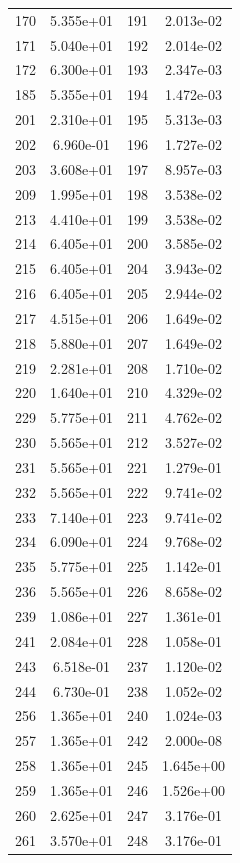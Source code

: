\documentclass[12pt]{article}
\begin{document}
\begin{longtable}{@{}cccc@{}}
170 & 5.355e+01 & 191 & 2.013e-02 \\
171 & 5.040e+01 & 192 & 2.014e-02 \\
172 & 6.300e+01 & 193 & 2.347e-03 \\
185 & 5.355e+01 & 194 & 1.472e-03 \\
201 & 2.310e+01 & 195 & 5.313e-03 \\
202 & 6.960e-01 & 196 & 1.727e-02 \\
203 & 3.608e+01 & 197 & 8.957e-03 \\
209 & 1.995e+01 & 198 & 3.538e-02 \\
213 & 4.410e+01 & 199 & 3.538e-02 \\
214 & 6.405e+01 & 200 & 3.585e-02 \\
215 & 6.405e+01 & 204 & 3.943e-02 \\
216 & 6.405e+01 & 205 & 2.944e-02 \\
217 & 4.515e+01 & 206 & 1.649e-02 \\
218 & 5.880e+01 & 207 & 1.649e-02 \\
219 & 2.281e+01 & 208 & 1.710e-02 \\
220 & 1.640e+01 & 210 & 4.329e-02 \\
229 & 5.775e+01 & 211 & 4.762e-02 \\
230 & 5.565e+01 & 212 & 3.527e-02 \\
231 & 5.565e+01 & 221 & 1.279e-01 \\
232 & 5.565e+01 & 222 & 9.741e-02 \\
233 & 7.140e+01 & 223 & 9.741e-02 \\
234 & 6.090e+01 & 224 & 9.768e-02 \\
235 & 5.775e+01 & 225 & 1.142e-01 \\
236 & 5.565e+01 & 226 & 8.658e-02 \\
239 & 1.086e+01 & 227 & 1.361e-01 \\
241 & 2.084e+01 & 228 & 1.058e-01 \\
243 & 6.518e-01 & 237 & 1.120e-02 \\
244 & 6.730e-01 & 238 & 1.052e-02 \\
256 & 1.365e+01 & 240 & 1.024e-03 \\
257 & 1.365e+01 & 242 & 2.000e-08 \\
258 & 1.365e+01 & 245 & 1.645e+00 \\
259 & 1.365e+01 & 246 & 1.526e+00 \\
260 & 2.625e+01 & 247 & 3.176e-01 \\
261 & 3.570e+01 & 248 & 3.176e-01 \\

\end{longtable}
\end{document}
